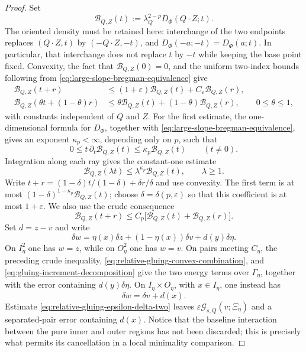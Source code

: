 \documentclass[11pt,reqno]{amsart}
\numberwithin{equation}{section}
\theoremstyle{remark}
\begin{document}
\begin{proof}
Set
\[
 \mathcal B_{Q,Z}(t):=\lambda_Q^{2-p}
 D_\Phi(Q\cdot Z;t).
\]
The oriented density must be retained here: interchange of the two
endpoints replaces \((Q\cdot Z,t)\) by \((-Q\cdot Z,-t)\), and
\(D_\Phi(-a;-t)=D_\Phi(a;t)\).  In particular, that interchange does
not replace \(t\) by \(-t\) while keeping the base point fixed.
Convexity, the fact that \(\mathcal B_{Q,Z}(0)=0\), and the uniform
two-index bounds following from
\eqref{eq:large-slope-bregman-equivalence} give
\begin{align}
 \mathcal B_{Q,Z}(t+r)
 &\le(1+\varepsilon)\mathcal B_{Q,Z}(t)
      +C_\varepsilon\mathcal B_{Q,Z}(r),
 \label{eq:relative-gluing-epsilon-delta-two}\\
 \mathcal B_{Q,Z}(\theta t+(1-\theta)r)
 &\le\theta\mathcal B_{Q,Z}(t)
      +(1-\theta)\mathcal B_{Q,Z}(r),
 \qquad 0\le\theta\le1,
 \label{eq:relative-gluing-convex-combination}
\end{align}
with constants independent of \(Q\) and \(Z\).  For the first estimate,
the one-dimensional formula for \(D_\Phi\), together with
\eqref{eq:large-slope-bregman-equivalence}, gives an exponent
\(\kappa_p<\infty\), depending only on \(p\), such that
\[
 0\le t\,\partial_t\mathcal B_{Q,Z}(t)
 \le\kappa_p\mathcal B_{Q,Z}(t)\qquad(t\ne0).
\]
Integration along each ray gives the constant-one estimate
\[
 \mathcal B_{Q,Z}(\lambda t)
 \le\lambda^{\kappa_p}\mathcal B_{Q,Z}(t),
 \qquad \lambda\ge1.
\]
Write \(t+r=(1-\delta)t/(1-\delta)+\delta r/\delta\) and use convexity.
The first term is at most
\((1-\delta)^{1-\kappa_p}\mathcal B_{Q,Z}(t)\); choose
\(\delta=\delta(p,\varepsilon)\) so that this coefficient is at most
\(1+\varepsilon\).
We also use the crude consequence
\[
 \mathcal B_{Q,Z}(t+r)
 \le C_p\bigl[\mathcal B_{Q,Z}(t)+\mathcal B_{Q,Z}(r)\bigr].
\]
Set \(d=z-v\) and
write
\begin{equation}
 \delta w=\eta(x)\delta z+(1-\eta(x))\delta v
 +d(y)\delta\eta.
 \label{eq:gluing-increment-decomposition}
\end{equation}
On \(I_\eta^2\) one has \(w=z\), while on \(O_\eta^2\) one has
\(w=v\).  On pairs meeting \(C_\eta\), the preceding crude inequality,
\eqref{eq:relative-gluing-convex-combination}, and
\eqref{eq:gluing-increment-decomposition} give the two energy terms over
\(\Gamma_\eta\), together with the error containing
\(d(y)\delta\eta\).  On \(I_\eta\times O_\eta\), with \(x\in I_\eta\),
one instead has
\[
 \delta w=\delta v+d(x).
\]
Estimate \eqref{eq:relative-gluing-epsilon-delta-two} leaves
\(\varepsilon\mathscr G_{s,Q}(v;\Xi_\eta)\) and a separated-pair error
containing \(d(x)\).  Notice that the baseline interaction between the
pure inner and outer regions has not been discarded; this is precisely
what permits its cancellation in a local minimality comparison.


\end{proof}
\end{document}
